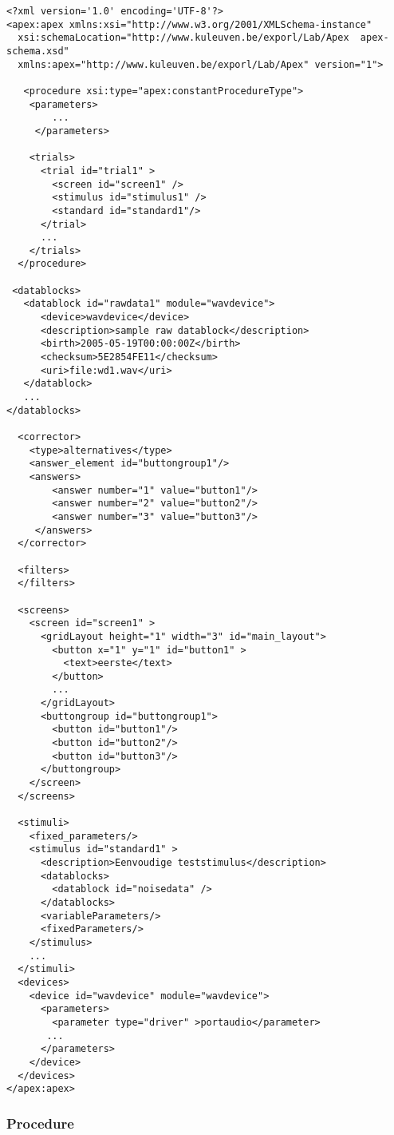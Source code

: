 \documentclass[a4paper,12pt]{article}
\begin{document}
\begin{verbatim}
<?xml version='1.0' encoding='UTF-8'?>
<apex:apex xmlns:xsi="http://www.w3.org/2001/XMLSchema-instance"
  xsi:schemaLocation="http://www.kuleuven.be/exporl/Lab/Apex  apex-schema.xsd"
  xmlns:apex="http://www.kuleuven.be/exporl/Lab/Apex" version="1">
  
   <procedure xsi:type="apex:constantProcedureType">
    <parameters>
      	...
     </parameters>
    
    <trials>
      <trial id="trial1" >
        <screen id="screen1" />
        <stimulus id="stimulus1" />
        <standard id="standard1"/>
      </trial>
      ...
    </trials>
  </procedure>
  
 <datablocks>
   <datablock id="rawdata1" module="wavdevice">
      <device>wavdevice</device>
      <description>sample raw datablock</description>
      <birth>2005-05-19T00:00:00Z</birth>
      <checksum>5E2854FE11</checksum>
      <uri>file:wd1.wav</uri>
   </datablock>
   ...
</datablocks>

  <corrector>
    <type>alternatives</type>
    <answer_element id="buttongroup1"/>
    <answers>
        <answer number="1" value="button1"/>
        <answer number="2" value="button2"/>
        <answer number="3" value="button3"/>
     </answers>
  </corrector>
  
  <filters>
  </filters>
  
  <screens>
    <screen id="screen1" >
      <gridLayout height="1" width="3" id="main_layout">
        <button x="1" y="1" id="button1" >
          <text>eerste</text>
        </button>
      	...
      </gridLayout>
      <buttongroup id="buttongroup1">
        <button id="button1"/>
        <button id="button2"/>
        <button id="button3"/>
      </buttongroup>
    </screen>
  </screens>
  
  <stimuli>
    <fixed_parameters/>
    <stimulus id="standard1" >
      <description>Eenvoudige teststimulus</description>
      <datablocks>
        <datablock id="noisedata" />
      </datablocks>
      <variableParameters/>
      <fixedParameters/>
    </stimulus> 
    ...
  </stimuli>    
  <devices>
    <device id="wavdevice" module="wavdevice">
      <parameters>
        <parameter type="driver" >portaudio</parameter>
	   ...
      </parameters>
    </device>
  </devices>
</apex:apex>
\end{verbatim}

\subsubsection{Procedure}
\end{document}
